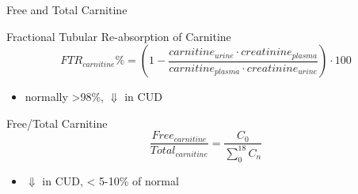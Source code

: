 \documentclass[presentation, smaller]{beamer}
\begin{document}
\begin{frame}[label={sec:orgheadline6}]{Free and Total Carnitine}
\begin{block}{Fractional Tubular Re-absorption of Carnitine}
\begin{equation*}
FTR_{carnitine}\% = \left( 1 -  \frac{carnitine_{urine} \cdot creatinine_{plasma}}{carnitine_{plasma} \cdot creatinine_{urine}}\right) \cdot 100
\end{equation*}

\begin{itemize}
\item normally >98\%, \(\Downarrow\) in CUD
\end{itemize}
\end{block}

\begin{block}{Free/Total Carnitine}
\[
\frac{Free_{carnitine}}{Total_{carnitine}} = \frac{C_0}{\sum_{0}^{18} C_n}
\]

\begin{itemize}
\item \(\Downarrow\) in CUD, < 5-10\% of normal
\end{itemize}
\end{block}
\end{frame}
\end{document}
